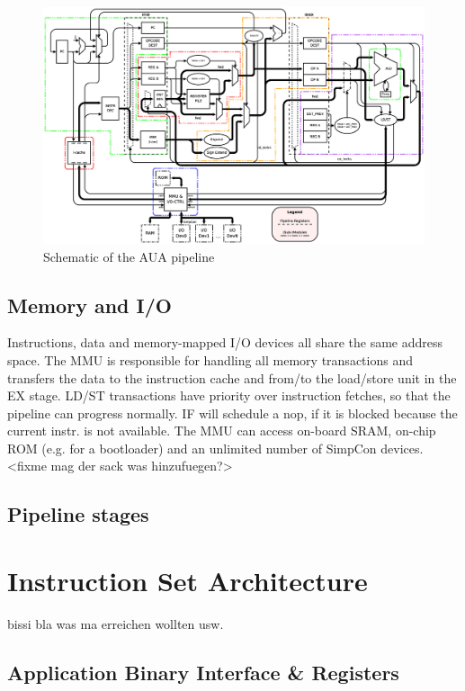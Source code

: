 \documentclass[%
	pdftex,
	a4paper,
	oneside,
	bibtotoc,%
	idxtotoc,%
	bibtotocnumbered,
	halfparskip,%
]{scrbook}
\begin{document}
\begin{figure}[h!]
	\centerline { %
	\includegraphics[width=1.2\textwidth]{schematic}
	}
	\caption[Schematic of the AUA pipeline]
	{Schematic of the AUA pipeline
	\label{label-schematic} }
\end{figure}
\section{Memory and I/O}
Instructions, data and memory-mapped I/O devices all share the same address space.
The MMU is responsible for handling all memory transactions and transfers the data
to the instruction cache and from/to the load/store unit in the EX stage.
LD/ST transactions have priority over instruction fetches, so that the pipeline can
progress normally. IF will schedule a nop, if it is blocked because the current instr.
is not available.
The MMU can access on-board SRAM, on-chip ROM (e.g. for a bootloader) and an unlimited
number of SimpCon devices. <fixme mag der sack was hinzufuegen?>
\section{Pipeline stages}

\chapter{Instruction Set Architecture}
bissi bla was ma erreichen wollten usw.
\section{Application Binary Interface \& Registers}
\end{document}
